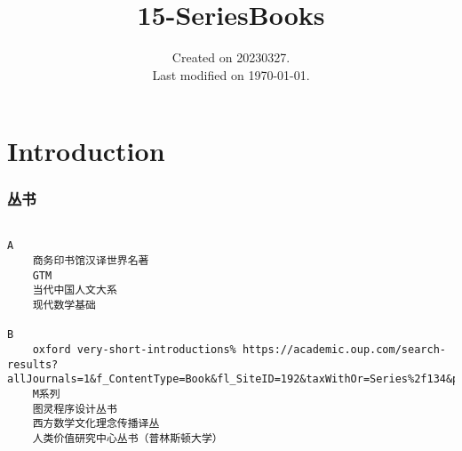 \documentclass[UTF8]{../RepresentationUniverse}
\begin{document}
\title{15-SeriesBooks}
\date{Created on 20230327.\\   Last modified on \today.}
\maketitle
\tableofcontents


\chapter{Introduction}


\subsection{丛书}

\begin{lstlisting}

A  
    商务印书馆汉译世界名著
    GTM
    当代中国人文大系
    现代数学基础

B
    oxford very-short-introductions% https://academic.oup.com/search-results?allJournals=1&f_ContentType=Book&fl_SiteID=192&taxWithOr=Series%2f134&page=1&sort=Date+%e2%80%93+Oldest+First
    M系列
    图灵程序设计丛书
    西方数学文化理念传播译丛
    人类价值研究中心丛书（普林斯顿大学）

    
\end{lstlisting}
\end{document}
